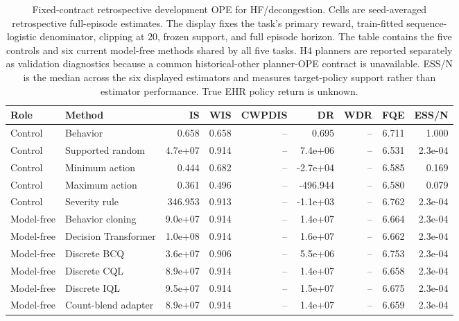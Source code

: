 \begin{table}[p]
\centering
\caption{Fixed-contract retrospective development OPE for HF/decongestion. Cells are seed-averaged retrospective full-episode estimates. The display fixes the task's primary reward, train-fitted sequence-logistic denominator, clipping at 20, frozen support, and full episode horizon. The table contains the five controls and six current model-free methods shared by all five tasks. H4 planners are reported separately as validation diagnostics because a common historical-other planner-OPE contract is unavailable. ESS/N is the median across the six displayed estimators and measures target-policy support rather than estimator performance. True EHR policy return is unknown.}
\label{tab:ope-estimator-hf}
\scriptsize
\setlength{\tabcolsep}{3.6pt}
\begin{tabular}{llrrrrrrr}
\toprule
Role & Method & IS & WIS & CWPDIS & DR & WDR & FQE & ESS/N \\
\midrule
Control & Behavior & 0.658 & 0.658 & -- & 0.695 & -- & 6.711 & 1.000 \\
Control & Supported random & 4.7e+07 & 0.914 & -- & 7.4e+06 & -- & 6.531 & 2.3e-04 \\
Control & Minimum action & 0.444 & 0.682 & -- & -2.7e+04 & -- & 6.585 & 0.169 \\
Control & Maximum action & 0.361 & 0.496 & -- & -496.944 & -- & 6.580 & 0.079 \\
Control & Severity rule & 346.953 & 0.913 & -- & -1.1e+03 & -- & 6.762 & 2.3e-04 \\
\midrule
Model-free & Behavior cloning & 9.0e+07 & 0.914 & -- & 1.4e+07 & -- & 6.664 & 2.3e-04 \\
Model-free & Decision Transformer & 1.0e+08 & 0.914 & -- & 1.6e+07 & -- & 6.662 & 2.3e-04 \\
Model-free & Discrete BCQ & 3.6e+07 & 0.906 & -- & 5.5e+06 & -- & 6.753 & 2.3e-04 \\
Model-free & Discrete CQL & 8.9e+07 & 0.914 & -- & 1.4e+07 & -- & 6.658 & 2.3e-04 \\
Model-free & Discrete IQL & 9.5e+07 & 0.914 & -- & 1.5e+07 & -- & 6.675 & 2.3e-04 \\
Model-free & Count-blend adapter & 8.9e+07 & 0.914 & -- & 1.4e+07 & -- & 6.659 & 2.3e-04 \\
\bottomrule
\end{tabular}
\end{table}

